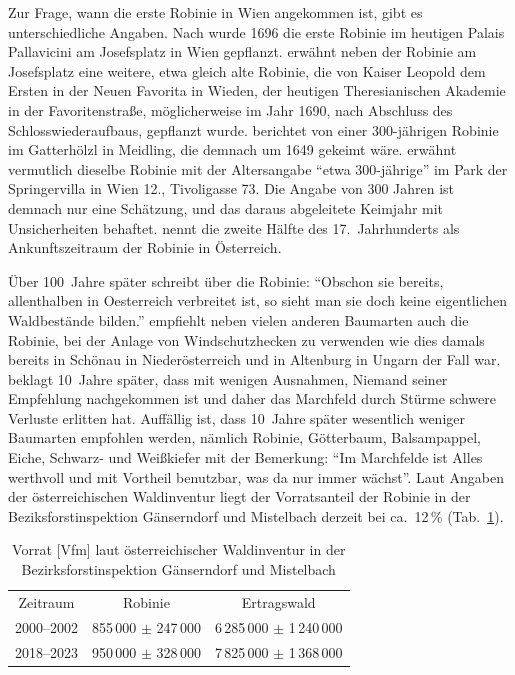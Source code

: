 \documentclass[twocolumn]{scrartcl}
\begin{document}
Zur Frage, wann die erste Robinie in Wien angekommen ist, gibt es
unterschiedliche Angaben. Nach \citet[S.~147]{loudon1838arboretum1}
wurde 1696 die erste Robinie im heutigen Palais Pallavicini am
Josefsplatz in Wien
gepflanzt. \citet[S.~15--16]{jacquin1825univGarten} erwähnt neben der
Robinie am Josefsplatz eine weitere, etwa gleich alte Robinie, die von
Kaiser Leopold dem Ersten in der Neuen Favorita in Wieden, der
heutigen Theresianischen Akademie in der Favoritenstraße,
möglicherweise im Jahr 1690, nach Abschluss des Schlosswiederaufbaus,
gepflanzt wurde. \citet{jagr1949robinie} berichtet von einer
300-jährigen Robinie im Gatterhölzl in Meidling, die demnach um 1649
gekeimt wäre. \citet{anonymNatLand1949robinie} erwähnt vermutlich
dieselbe Robinie mit der Altersangabe \enquote{etwa 300-jährige} im
Park der Springervilla in Wien 12., Tivoligasse 73. Die Angabe von 300
Jahren ist demnach nur eine Schätzung, und das daraus abgeleitete
Keimjahr mit Unsicherheiten behaftet. \citet[S.~1395]{hegi1924band43}
nennt die zweite Hälfte des 17.~Jahrhunderts als Ankunftszeitraum der
Robinie in Österreich.

Über 100~Jahre später schreibt
\citet[S.~339]{Feistmantel1835dieForstwissenschaft} über die Robinie:
\enquote{Obschon sie bereits, allenthalben in Oesterreich verbreitet
  ist, so sieht man sie doch keine eigentlichen Waldbestände bilden.}
\citet{hofmann1851baumloseEbenen} empfiehlt neben vielen anderen
Baumarten auch die Robinie, bei der Anlage von Windschutzhecken zu
verwenden wie dies damals bereits in Schönau in Niederösterreich und
in Altenburg in Ungarn der Fall war.
\citet{hofmann1861waldbaumCulturWarchfelde} beklagt 10~Jahre später,
dass mit wenigen Ausnahmen, Niemand seiner Empfehlung nachgekommen ist
und daher das Marchfeld durch Stürme schwere Verluste erlitten hat.
Auffällig ist, dass 10~Jahre später wesentlich weniger Baumarten
empfohlen werden, nämlich Robinie, Götterbaum, Balsampappel, Eiche,
Schwarz- und Weißkiefer mit der Bemerkung: \enquote{Im Marchfelde ist
  Alles werthvoll und mit Vortheil benutzbar, was da nur immer
  wächst}.
Laut Angaben der österreichischen Waldinventur
\citep{bfw2025waldinventurWeb} liegt der Vorratsanteil der Robinie in
der Beziksforstinspektion Gänserndorf und Mistelbach derzeit bei
ca.\ 12\,\% (Tab.~\ref{tab:waldinventur}).

\begin{table}[htbp]
  \centering
\begin{tabular}{ccc}
Zeitraum   & Robinie  & Ertragswald \\
2000--2002  & 855\,000 $\pm$ 247\,000 & 6\,285\,000 $\pm$ 1\,240\,000 \\
2018--2023  & 950\,000 $\pm$ 328\,000 & 7\,825\,000 $\pm$ 1\,368\,000 
  \end{tabular}
  \caption{Vorrat [Vfm] laut österreichischer Waldinventur \citep{bfw2025waldinventurWeb} in der Bezirksforstinspektion Gänserndorf und Mistelbach}
  \label{tab:waldinventur}
\end{table}
\end{document}
